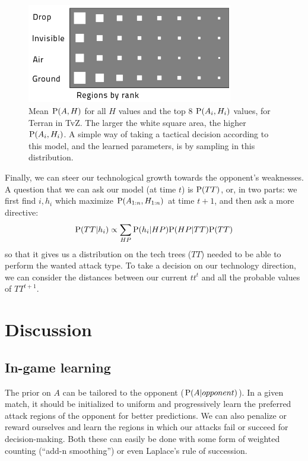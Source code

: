 \begin{figure}[!h]
\centerline{\includegraphics[width=9cm]{images/WhereHow_T_TvZ_light.png}}
\caption{Mean $\mathrm{P}(A,H)$ for all $H$ values and the top 8 $\mathrm{P}(A_i,H_i)$ values, for Terran in TvZ. The larger the white square area, the higher $\mathrm{P}(A_i,H_i)$. A simple way of taking a tactical decision according to this model, and the learned parameters, is by sampling in this distribution.}
\label{fig:WhereHow}
\end{figure}

Finally, we can steer our technological growth towards the opponent's weaknesses. A question that we can ask our model (at time $t$) is $\mathrm{P}(TT)$, or, in two parts: we first find $i,h_i$ which maximize $\mathrm{P}(A_{1:n},H_{1:n})$ at time $t+1$, and then ask a more directive:
$$\mathrm{P}(TT|h_i) \propto \sum_{HP} \mathrm{P}(h_i|HP)\mathrm{P}(HP|TT)\mathrm{P}(TT)$$
so that it gives us a distribution on the tech trees ($TT$) needed to be able to perform the wanted attack type. To take a decision on our technology direction, we can consider the distances between our current $tt^t$ and all the probable values of $TT^{t+1}$.


\section{Discussion}


\subsection{In-game learning}
The prior on $A$ %
can be tailored to the opponent ($\mathrm{P}(A|opponent)$). In a given match, it should be initialized to uniform and progressively learn the preferred attack regions of the opponent for better predictions. We can also penalize or reward ourselves and learn the regions in which our attacks fail or succeed for decision-making. Both these can easily be done with some form of weighted counting (``add-n smoothing'') or even Laplace's rule of succession.

